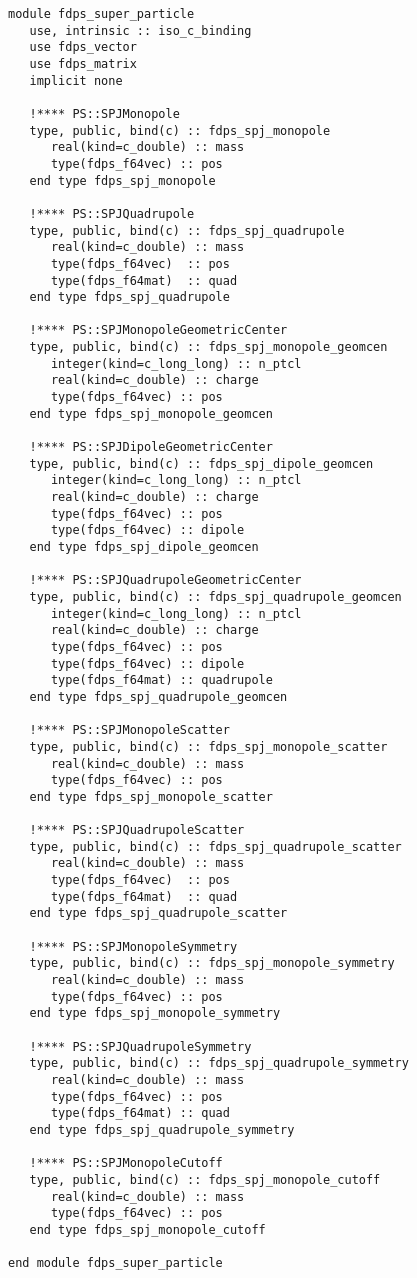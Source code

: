 \begin{lstlisting}[caption=Superparticle types (Fortran),label=listing:superparticle_types]
module fdps_super_particle
   use, intrinsic :: iso_c_binding
   use fdps_vector
   use fdps_matrix
   implicit none

   !**** PS::SPJMonopole
   type, public, bind(c) :: fdps_spj_monopole
      real(kind=c_double) :: mass
      type(fdps_f64vec) :: pos
   end type fdps_spj_monopole

   !**** PS::SPJQuadrupole
   type, public, bind(c) :: fdps_spj_quadrupole
      real(kind=c_double) :: mass
      type(fdps_f64vec)  :: pos
      type(fdps_f64mat)  :: quad
   end type fdps_spj_quadrupole

   !**** PS::SPJMonopoleGeometricCenter
   type, public, bind(c) :: fdps_spj_monopole_geomcen
      integer(kind=c_long_long) :: n_ptcl
      real(kind=c_double) :: charge
      type(fdps_f64vec) :: pos
   end type fdps_spj_monopole_geomcen

   !**** PS::SPJDipoleGeometricCenter
   type, public, bind(c) :: fdps_spj_dipole_geomcen
      integer(kind=c_long_long) :: n_ptcl
      real(kind=c_double) :: charge
      type(fdps_f64vec) :: pos
      type(fdps_f64vec) :: dipole
   end type fdps_spj_dipole_geomcen

   !**** PS::SPJQuadrupoleGeometricCenter
   type, public, bind(c) :: fdps_spj_quadrupole_geomcen
      integer(kind=c_long_long) :: n_ptcl
      real(kind=c_double) :: charge
      type(fdps_f64vec) :: pos
      type(fdps_f64vec) :: dipole
      type(fdps_f64mat) :: quadrupole
   end type fdps_spj_quadrupole_geomcen

   !**** PS::SPJMonopoleScatter
   type, public, bind(c) :: fdps_spj_monopole_scatter
      real(kind=c_double) :: mass
      type(fdps_f64vec) :: pos
   end type fdps_spj_monopole_scatter

   !**** PS::SPJQuadrupoleScatter
   type, public, bind(c) :: fdps_spj_quadrupole_scatter
      real(kind=c_double) :: mass
      type(fdps_f64vec)  :: pos
      type(fdps_f64mat)  :: quad
   end type fdps_spj_quadrupole_scatter

   !**** PS::SPJMonopoleSymmetry
   type, public, bind(c) :: fdps_spj_monopole_symmetry
      real(kind=c_double) :: mass
      type(fdps_f64vec) :: pos
   end type fdps_spj_monopole_symmetry

   !**** PS::SPJQuadrupoleSymmetry
   type, public, bind(c) :: fdps_spj_quadrupole_symmetry
      real(kind=c_double) :: mass
      type(fdps_f64vec) :: pos
      type(fdps_f64mat) :: quad
   end type fdps_spj_quadrupole_symmetry

   !**** PS::SPJMonopoleCutoff
   type, public, bind(c) :: fdps_spj_monopole_cutoff
      real(kind=c_double) :: mass
      type(fdps_f64vec) :: pos
   end type fdps_spj_monopole_cutoff
   
end module fdps_super_particle   
\end{lstlisting}

